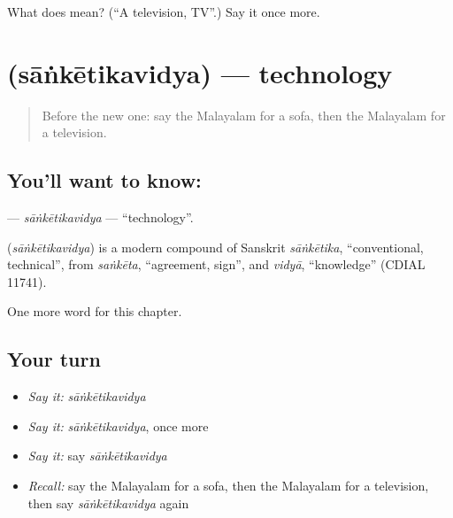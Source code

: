 \begin{tcolorbox}[breakable,colback=teal!4,colframe=teal!35!black,title={Before you move on}]
What does  mean? (\textquotedblleft{}A television, TV\textquotedblright{}.) Say it once more.
\end{tcolorbox}
\section[\texorpdfstring{\ml{സാങ്കേതികവിദ്യ} (sāṅkētikavidya)}{സാങ്കേതികവിദ്യ (sāṅkētikavidya)}]{ (sāṅkētikavidya) — technology}

\label{lesson:ML-C293-sanketikavidya}



\begin{quote}
Before the new one: say the Malayalam for a sofa, then the Malayalam for a television.
\end{quote}

\subsection*{You'll want to know: }
\textbf{} — \emph{sāṅkētikavidya} — \textquotedblleft{}technology\textquotedblright{}.

\begin{cousinweb}
\textbf{} (\emph{sāṅkētikavidya}) is a modern compound of Sanskrit \emph{sāṅkētika}, \textquotedblleft{}conventional, technical\textquotedblright{}, from \emph{saṅkēta}, \textquotedblleft{}agreement, sign\textquotedblright{}, and \emph{vidyā}, \textquotedblleft{}knowledge\textquotedblright{} (CDIAL 11741).
\end{cousinweb}

\begin{grammarlens}[title={What you've built}]
One more word for this chapter.
\end{grammarlens}

\subsection*{Your turn}
\begin{itemize}
\raggedright
  \item \emph{Say it:} \emph{sāṅkētikavidya}
  \item \emph{Say it:} \emph{sāṅkētikavidya}, once more
  \item \emph{Say it:} say \emph{sāṅkētikavidya}
  \item \emph{Recall:} say the Malayalam for a sofa, then the Malayalam for a television, then say \emph{sāṅkētikavidya} again
\end{itemize}

